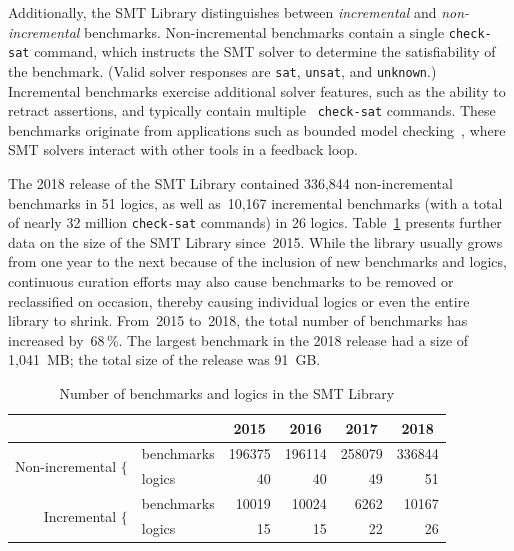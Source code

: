 \documentclass[dvipsnames,table,twoside,11pt]{article}
\begin{document}
Additionally, the SMT Library distinguishes between \emph{incremental}
and \emph{non-incremental} benchmarks.  Non-incremental benchmarks
contain a single {\tt check-sat} command, which instructs the SMT
solver to determine the satisfiability of the benchmark.  (Valid
solver responses are {\tt sat}, {\tt unsat}, and {\tt unknown}.)
Incremental benchmarks exercise additional solver features, such as
the ability to retract assertions, and typically contain multiple {\tt
  check-sat} commands.  These benchmarks originate from applications
such as bounded model
checking~\cite{Gunther:2014:IBS:2632362.2632374}, where SMT solvers
interact with other tools in a feedback loop.

The 2018 release of the SMT Library contained 336,844 non-incremental
benchmarks in 51 logics, as well as~10,167 incremental benchmarks
(with a total of nearly 32 million {\tt check-sat} commands) in 26
logics.  Table~\ref{table:smtlib} presents further data on the size of
the SMT Library since~2015.  While the library usually grows from one
year to the next because of the inclusion of new benchmarks and
logics, continuous curation efforts may also cause benchmarks to be
removed or reclassified on occasion, thereby causing individual logics
or even the entire library to shrink.  From~2015 to~2018, the total
number of benchmarks has increased by~68\,\%.  The largest benchmark
in the 2018 release had a size of 1,041~MB; the total size of the
release was 91~GB.

\begin{table}
  \caption{Number of benchmarks and logics in the SMT Library}
  \label{table:smtlib}
  \centering
  \begin{tabular}{r@{\ \ }lrrrr}
    \toprule
                               & & \multicolumn{1}{c}{2015} & \multicolumn{1}{c}{2016} & \multicolumn{1}{c}{2017} & \multicolumn{1}{c}{2018} \\
    \midrule
    \multirow{2}{*}{Non-incremental $\{$} & benchmarks & 196375 & 196114 & 258079 & 336844 \\
                                          & logics     &     40 &     40 &     49 &     51 \\
    \multirow{2}{*}{Incremental $\{$}     & benchmarks &  10019 &  10024 &   6262 &  10167 \\
                                          & logics     &     15 &     15 &     22 &     26 \\
    \bottomrule
  \end{tabular}
\end{table}
\end{document}
